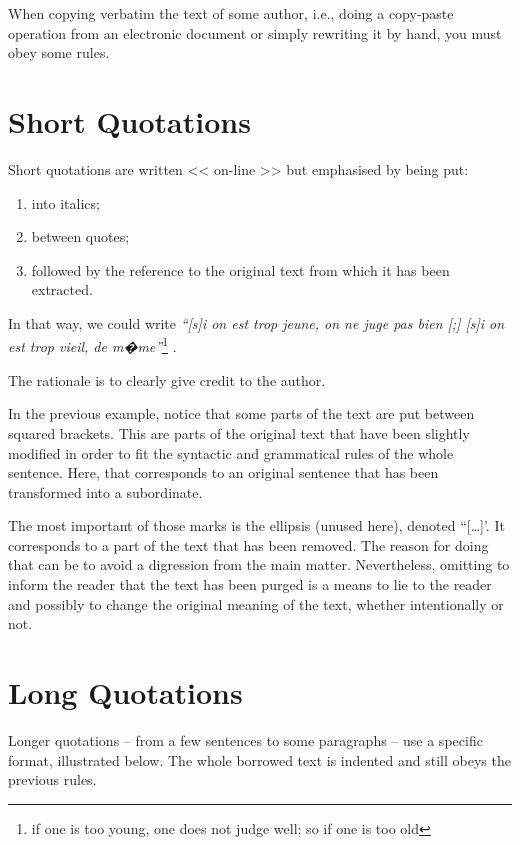 \label{ann:Citations}

When copying verbatim the text of some author, i.e., doing a copy-paste operation from an electronic document or simply rewriting it by hand, you must obey some rules.

\section{Short Quotations}

Short quotations are written << on-line >> but emphasised by being put:
\begin{enumerate}
   \item into italics;
   \item between quotes;
   \item followed by the reference to the original text from which it has been extracted.
\end{enumerate}

In that way, we could write \emph{``[s]i on est trop jeune, on ne juge pas bien [;] [s]i on est trop vieil, de m�me''}\footnote{if one is too young, one does not judge well;  so if one is too old} \cite{Pascal-1671}.

The rationale is to clearly give credit to the author.

\bigskip

In the previous example, notice that some parts of the text are put between squared brackets.
This are parts of the original text that have been slightly modified in order to fit the syntactic and grammatical rules of the whole sentence.
Here, that corresponds to an original sentence that has been transformed into a subordinate.

The most important of those marks is the ellipsis (unused here), denoted ``[\ldots]'.
It corresponds to a part of the text that has been removed.
The reason for doing that can be to avoid a digression from the main matter.
Nevertheless, omitting to inform the reader that the text has been purged is a means to lie to the reader and possibly to change the original meaning of the text, whether intentionally or not.

\section{Long Quotations}

Longer quotations -- from a few sentences to some paragraphs -- use a specific format, illustrated below.
The whole borrowed text is indented and still obeys the previous rules.

